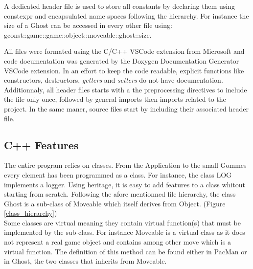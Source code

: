 A dedicated header file is used to store all constants by declaring them using \textsf{constexpr} and encapsulated name spaces following the hierarchy. For instance the size of a \textsf{Ghost} can be accessed in every other file using: \textsf{gconst::game::game::object::moveable::ghost::size}.

All files were formated using the C/C++ VSCode extension from Microsoft and code documentation was generated by the Doxygen Documentation Generator VSCode extension.\cite{cpp_tools}\cite{gen_doc} In an effort to keep the code readable, explicit functions like constructors, destructors, \textit{getters} and \textit{setters} do not have documentation.
Additionnaly, all header files starts with a the preprocessing directives to include the file only once, followed by general imports then imports related to the project. In the same maner, source files start by including their associated header file.

\subsection{C++ Features}
The entire program relies on classes. From the \textsf{Application} to the small \textsf{Gommes} every element has been programmed as a class. For instance, the class \textsf{LOG} implements a logger. Using heritage, it is easy to add features to a class whitout starting from scratch. Following the afore mentionned file hierarchy, the class \textsf{Ghost} is a sub-class of \textsf{Moveable} which itself derives from \textsf{Object}. (Figure \ref{class_hierarchy})\\
Some classes are virtual meaning they contain virtual function(s) that must be implemented by the sub-class. For instance \textsf{Moveable} is a virtual class as it does not represent a real game object and contains among other \textsf{move} which is a virtual function. The definition of this method can be found either in \textsf{PacMan} or in \textsf{Ghost}, the two classes that inherits from \textsf{Moveable}.

